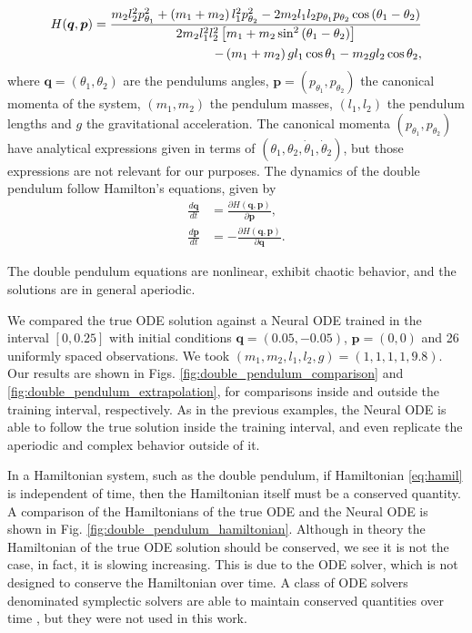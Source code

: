 \documentclass[final,onefignum,onetabnum]{siamart220329}
\newcommand{\bol}{\boldsymbol}
\newcounter{example}
\begin{document}
\begin{align}
	H(\bol q,\bol p)=\frac{m_2 l_2^2 p_{\theta_1}^2+\left(m_1+m_2\right) l_1^2 p_{\theta_2}^2-2 m_2 l_1 l_2 p_{\theta_1} p_{\theta_2} \cos \left(\theta_1-\theta_2\right)}{2 m_2 l_1^2 l_2^2\left[m_1+m_2 \sin ^2\left(\theta_1-\theta_2\right)\right]} \notag\\
	-\left(m_1+m_2\right) g l_1 \cos \theta_1-m_2 g l_2 \cos \theta_2, \label{eq:hamil}
\end{align}
where $\bol q = (\theta_1,\theta_2)$ are the pendulums angles, $\bol p =(p_{\theta_1}, p_{\theta_2})$ the canonical momenta of the system, $(m_1,m_2)$ the pendulum masses, $(l_1,l_2)$ the pendulum lengths and $g$ the gravitational acceleration. The canonical momenta $(p_{\theta_1}, p_{\theta_2})$ have analytical expressions given in terms of $(\theta_1,\theta_2,\dot{\theta}_1,\dot{\theta}_2)$, but those expressions are not relevant for our purposes. The dynamics of the double pendulum follow Hamilton's equations, given by
\begin{subequations}
\begin{align}
	\frac{d\bol{q}}{dt} &= \frac{\partial H(\bol q,\bol p)}{\partial \bol{p}},\\
	\frac{d\bol{p}}{dt} &= -\frac{\partial H(\bol q,\bol p)}{\partial \bol{q}}.
\end{align} \label{eq:hamilton_eq}
\end{subequations}


The double pendulum equations are nonlinear, exhibit chaotic behavior, and the solutions are in general aperiodic.

We compared the true ODE solution against a Neural ODE trained in the interval $[0,0.25]$ with initial conditions $\bol q = (0.05,-0.05)$, $\bol p =(0,0)$ and 26 uniformly spaced observations. We took $(m_1,m_2,l_1,l_2,g) = (1,1,1,1,9.8)$. Our results are shown in Figs. \ref{fig:double_pendulum_comparison} and \ref{fig:double_pendulum_extrapolation}, for comparisons inside and outside the training interval, respectively. As in the previous examples, the Neural ODE is able to follow the true solution inside the training interval, and even replicate the aperiodic and complex behavior outside of it.

In a Hamiltonian system, such as the double pendulum, if Hamiltonian \eqref{eq:hamil} is independent of time, then the Hamiltonian itself must be a conserved quantity. A comparison of the Hamiltonians of the true ODE and the Neural ODE is shown in Fig. \ref{fig:double_pendulum_hamiltonian}. Although in theory the Hamiltonian of the true ODE solution should be conserved, we see it is not the case, in fact, it is slowing increasing. This is due to the ODE solver, which is not designed to conserve the Hamiltonian over time. A class of ODE solvers denominated symplectic solvers are able to maintain conserved quantities over time \cite{leimkuhler2004simulating}, but they were not used in this work. 
\end{document}
